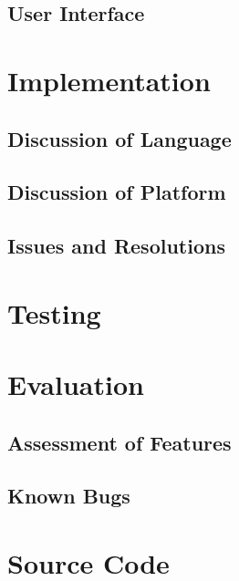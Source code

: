 \documentclass[draft]{book}
\begin{document}
\section{User Interface}


\chapter{Implementation}

\section{Discussion of Language}

\section{Discussion of Platform}

\section{Issues and Resolutions}


\chapter{Testing}


\chapter{Evaluation}

\section{Assessment of Features}

\section{Known Bugs}

\appendix

\chapter{Source Code}

\backmatter

\listoffigures

\listoftables



\printglossaries
\end{document}
